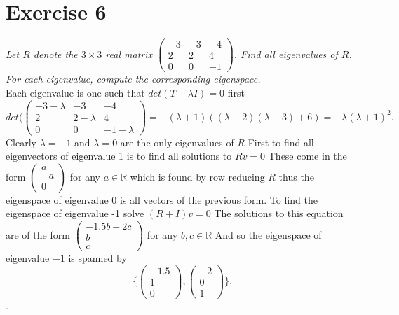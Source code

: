 \documentclass{article}
\begin{document}
    \section{Exercise 6}
    \emph{
        Let $R$ denote the $3 \times 3$ real matrix $\begin{pmatrix} -3 & -3 & -4\\
        2 & 2 & 4\\
    0 & 0 & -1\end{pmatrix} $. Find all eigenvalues of $R$. For 
    each eigenvalue, compute the corresponding eigenspace.
    }\\
    Each eigenvalue is one such that $det(T-\lambda I) = 0$ 
    first
    \[
    det( \begin{pmatrix} 
        -3-\lambda & -3 & -4\\
        2 & 2-\lambda & 4\\
        0 & 0 & -1 - \lambda
    \end{pmatrix} 
    = -(\lambda + 1)((\lambda-2)(\lambda+3)+6) = -\lambda(\lambda+1)^2
    .\] 
    Clearly $\lambda = -1$ and $\lambda = 0$ are the only eigenvalues of $R$
    First to find all eigenvectors of eigenvalue 1 is to find all solutions to
    $Rv = 0$ These come in the form  $ \begin{pmatrix} a \\ -a \\ 0 \end{pmatrix} $ for any $a \in \mathbb{R}$ which is found by 
    row reducing $R$ thus the eigenspace of eigenvalue 0 is all vectors of the previous form.
    To find the eigenspace of eigenvalue -1 solve $(R+I)v = 0$ The solutions to this equation
    are of the form $\begin{pmatrix} -1.5b - 2c \\ b \\ c \end{pmatrix} $ for any $b,c \in \mathbb{R}$ And so the
    eigenspace of eigenvalue $-1$ is spanned by
    \[
        \{ \begin{pmatrix} -1.5 \\ 1 \\ 0 \end{pmatrix} , \begin{pmatrix} -2 \\ 0 \\ 1 \end{pmatrix} \}
    .\] 
    .
\end{document}
